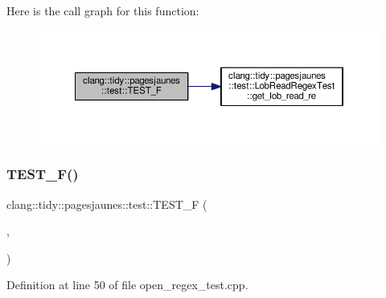 Here is the call graph for this function\+:
\nopagebreak
\begin{figure}[H]
\begin{center}
\leavevmode
\includegraphics[width=350pt]{namespaceclang_1_1tidy_1_1pagesjaunes_1_1test_a8901d799343ceabfae305d4a75e028ef_cgraph}
\end{center}
\end{figure}
\mbox{\label{namespaceclang_1_1tidy_1_1pagesjaunes_1_1test_a6a10a0e5bc2065fff16057f836ffcb48}} 
\subsubsection{\texorpdfstring{T\+E\+S\+T\+\_\+\+F()}{TEST\_F()}\hspace{0.1cm}{\footnotesize\ttfamily [16/57]}}
{\footnotesize\ttfamily clang\+::tidy\+::pagesjaunes\+::test\+::\+T\+E\+S\+T\+\_\+F (\begin{DoxyParamCaption}\item[{\hyperlink{classclang_1_1tidy_1_1pagesjaunes_1_1test_1_1_open_regex_test}{Open\+Regex\+Test}}]{,  }\item[{Regex\+Matching}]{ }\end{DoxyParamCaption})}



Definition at line 50 of file open\+\_\+regex\+\_\+test.\+cpp.

